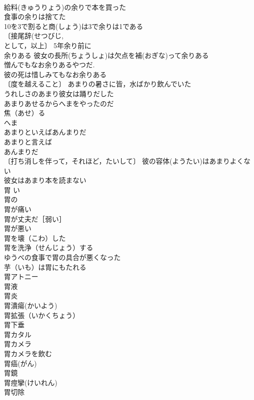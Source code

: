 \documentclass[8pt]{extreport}
\begin{document}
\begin{CJK}{UTF8}{min}
\\	給料(きゅうりょう)の余りで本を買った 
\\	食事の余りは捨てた 
\\	10を3で割ると商(しょう)は3で余りは1である 
\\	〔接尾辞(せつびじ,　
\\	として，以上〕 5年余り前に 
\\	余りある 彼女の長所(ちょうしょ)は欠点を補(おぎな)って余りある 
\\	憎んでもなお余りあるやつだ. 
\\	彼の死は惜しみてもなお余りある 
\\	〔度を越えること〕 あまりの暑さに皆，水ばかり飲んでいた 
\\	うれしさのあまり彼女は踊りだした 
\\	あまりあせるからへまをやったのだ 
\\	焦（あせ）る　
\\	へま　
\\	あまりといえばあんまりだ 
\\	あまりと言えば 
\\	あんまりだ 
\\	〔打ち消しを伴って，それほど，たいして〕 彼の容体(ようたい)はあまりよくない 
\\	彼女はあまり本を読まない 
\\	胃	い	
\\	胃の 
\\	胃が痛い 
\\	胃が丈夫だ［弱い］ 
\\	胃が悪い 
\\	胃を壊（こわ）した 
\\	胃を洗浄（せんじょう）する 
\\	ゆうべの食事で胃の具合が悪くなった 
\\	芋（いも）は胃にもたれる 
\\	胃アトニー 
\\	胃液 
\\	胃炎 
\\	胃潰瘍(かいよう) 
\\	胃拡張（いかくちょう） 
\\	胃下垂 
\\	胃カタル 
\\	胃カメラ 
\\	胃カメラを飲む 
\\	胃癌(がん) 
\\	胃鏡 
\\	胃痙攣(けいれん) 
\\	胃切除 

\end{CJK}
\end{document}
